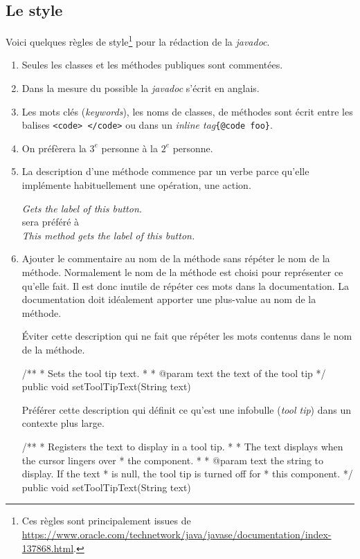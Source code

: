 \subsection{Le style}

Voici quelques règles de style\footnote{Ces règles sont principalement issues de \url{https://www.oracle.com/technetwork/java/javase/documentation/index-137868.html}.} pour la rédaction de la \textit{javadoc}.

\begin{enumerate}
	
	\item Seules les classes et les méthodes publiques sont commentées. 

	\item Dans la mesure du possible la \textit{javadoc} s'écrit en anglais. 

	\item Les mots clés (\textit{keywords}), les noms de classes, de méthodes
		sont écrit entre les balises \texttt{<code> </code>} ou
		dans un \emph{inline tag}\texttt{\{@code foo\}}.

	\item On préfèrera la $3^e$ personne à la $2^e$ personne. 

	\item La description d'une méthode commence par un verbe parce qu'elle
		implémente habituellement une opération, une action. 
	
		\medskip 
		\textit{Gets the label of this button.} \\
		sera préféré à \\
		\textit{This method gets the label of this button.}

	\item Ajouter le commentaire au nom de la méthode sans répéter le nom de la
		méthode. Normalement le nom de la méthode est choisi pour représenter
		ce qu'elle fait. Il est donc inutile de répéter ces mots dans la
		documentation. La documentation doit idéalement apporter une plus-value
		au nom de la méthode. 

		\medskip
		Éviter cette description qui ne fait que répéter les mots contenus 
		dans le nom de la méthode.
		\begin{java}
		/**
		  * Sets the tool tip text.
		  *
		  * @param text the text of the tool tip
		  */
		  public void setToolTipText(String text)
		\end{java}
		
		Préférer cette description qui définit ce qu'est une infobulle 
		(\textit{tool tip}) dans un contexte plus large. 
		\begin{java}
		/**
		  * Registers the text to display in a tool tip. 
		  * 
		  * The text displays when the cursor lingers over 
		  * the component.         
		  *
		  * @param text the string to display. If the text 
		  * is null, the tool tip is turned off for 
		  * this component. 
		  */
		  public void setToolTipText(String text)
		\end{java}


\end{enumerate}
